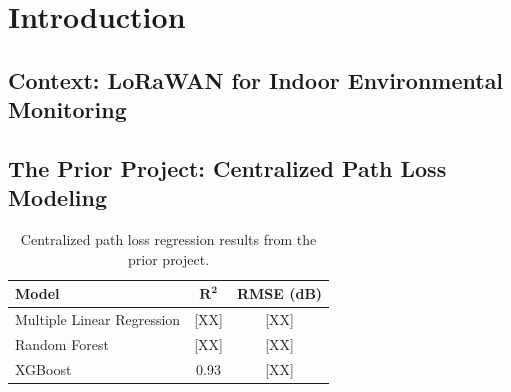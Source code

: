 \documentclass[12pt, a4paper, twoside, openright]{report}
\begin{document}
\tableofcontents\clearpage
\listoffigures{}\clearpage
\listoftables{}\clearpage
\printglossary[type=\acronymtype,title=List of Abbreviations]\clearpage

\setcounter{page}{1}

\chapter{Introduction}
\label{ch:introduction}

\section{Context: LoRaWAN for Indoor Environmental Monitoring}
\label{sec:context}

\section{The Prior Project: Centralized Path Loss Modeling}
\label{sec:prior-project}


\begin{table}[H]
  \centering
  \begin{tabular}{lcc}
    \toprule
    \textbf{Model} & $\boldsymbol{R^2}$ & \textbf{RMSE (dB)} \\
    \midrule
    Multiple Linear Regression & [XX]  & [XX] \\
    Random Forest              & [XX]  & [XX] \\
    XGBoost                    & 0.93  & [XX] \\
    \bottomrule
  \end{tabular}
  \caption{Centralized path loss regression results from the prior project.}
  \label{tab:prior-results}
\end{table}
\end{document}
